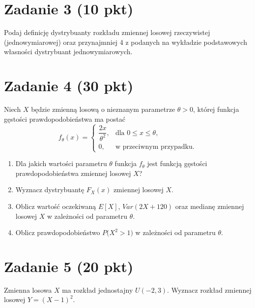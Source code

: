 \documentclass[polish, 10pt]{extarticle}
\begin{document}
\section*{Zadanie 3 (10 pkt)}
Podaj definicję dystrybuanty rozkładu zmiennej losowej rzeczywistej (jednowymiarowej) oraz
przynajmniej 4 z podanych na wykładzie podstawowych własności dystrybuant jednowymiarowych.

\section*{Zadanie 4 (30 pkt)}

Niech $X$ będzie zmienną losową o nieznanym parametrze $\theta > 0$, której funkcja
gęstości prawdopodobieństwa ma postać
\[
f_\theta(x) =
\begin{cases}
\dfrac{2x}{\theta^2}, & \text{dla } 0 \leq x \leq \theta,\\[4pt]
0, & \text{w przeciwnym przypadku.}
\end{cases}
\]

\begin{enumerate}[label=\alph*)]
    \item Dla jakich wartości parametru $\theta$ funkcja $f_\theta$ jest
    funkcją gęstości prawdopodobieństwa zmiennej losowej $X$?

    \item Wyznacz dystrybuantę $F_X(x)$ zmiennej losowej $X$.

    \item Oblicz wartość oczekiwaną $E[X]$, $Var(2X + 120)$ oraz medianę
    zmiennej losowej $X$ w zależności od parametru $\theta$.

    \item Oblicz prawdopodobieństwo $P\bigl(X^2 > 1\bigr)$ w zależności od parametru $\theta$.
\end{enumerate}

\section*{Zadanie 5 (20 pkt)}
Zmienna losowa \(X\) ma rozkład jednostajny \(U(-2, 3)\).
Wyznacz rozkład zmiennej losowej \(Y = (X-1)^2\).
\end{document}
